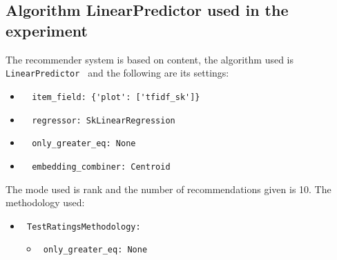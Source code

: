 \documentclass[11pt]{article}
\begin{document}
\hfill\break
\hfill\break



\subsection{Algorithm LinearPredictor used in the experiment}\label{subsec:algo_LinearPredictor}

The recommender system is based on content, the algorithm used
is \verb| LinearPredictor | and the following are its settings:
\begin{itemize}
\item \begin{verbatim}
  item_field: {'plot': ['tfidf_sk']}
\end{verbatim}
\item \begin{verbatim}
  regressor: SkLinearRegression
\end{verbatim}
\item \begin{verbatim}
  only_greater_eq: None
\end{verbatim}
\item \begin{verbatim}
  embedding_combiner: Centroid
\end{verbatim}
\end{itemize}
\hfill\break
The mode used is rank and the number of recommendations given
is 10.
The methodology used:
\begin{itemize}
    \item \verb| TestRatingsMethodology:|
    \begin{itemize}
                    \item \verb| only_greater_eq: None |
            \end{itemize}
\end{itemize}
\hfill\break



\hfill\break
\hfill\break
\end{document}
